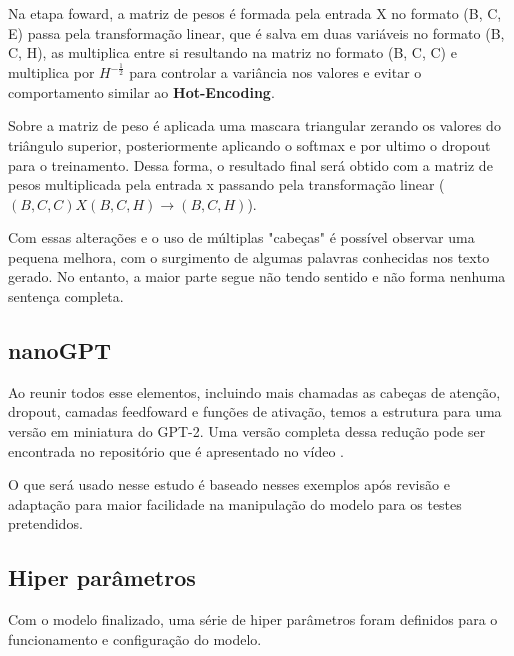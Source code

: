 \documentclass[9pt,technote]{IEEEtran}
\begin{document}
Na etapa foward, a matriz de pesos é formada pela entrada X no formato (B, C, E) passa pela transformação linear, que é salva em duas variáveis no formato (B, C, H), as multiplica entre si resultando na matriz no formato (B, C, C) e multiplica por $H^{-\frac{1}{2}}$ para controlar a variância nos valores e evitar o comportamento similar ao \textbf{Hot-Encoding}. 

Sobre a matriz de peso é aplicada uma mascara triangular zerando os valores do triângulo superior, posteriormente aplicando o softmax e por ultimo o dropout para o treinamento. Dessa forma, o resultado final será obtido com a matriz de pesos multiplicada pela entrada x passando pela transformação linear ($(B, C, C) X (B, C, H) \rightarrow (B, C, H)$).

Com essas alterações e o uso de múltiplas "cabeças" é possível observar uma pequena melhora, com o surgimento de algumas palavras conhecidas nos texto gerado. No entanto, a maior parte segue não tendo sentido e não forma nenhuma sentença completa.

\subsection{nanoGPT}
Ao reunir todos esse elementos, incluindo mais chamadas as cabeças de atenção, dropout, camadas feedfoward e funções de ativação, temos a estrutura para uma versão em miniatura do GPT-2. Uma versão completa dessa redução pode ser encontrada no repositório \cite{nanogpt_2026} que é apresentado no vídeo \cite{GPT_Youtube}.

O que será usado nesse estudo é baseado nesses exemplos após revisão e adaptação para maior facilidade na manipulação do modelo para os testes pretendidos.

\subsection{Hiper parâmetros}
Com o modelo finalizado, uma série de hiper parâmetros foram definidos para o funcionamento e configuração do modelo.
\end{document}
